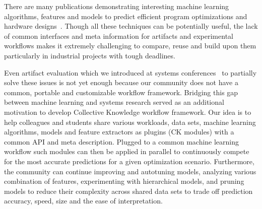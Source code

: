 There are many publications demonstrating interesting machine learning algorithms,
features and models to predict efficient program optimizations and hardware
designs~\cite{Monsifrot,SAMP2003,
Marin:2004:CPP:1012888.1005691, SA2005, soffa2005, ABCP06,
CFAP2007, DJBP2009, JGVP2009,
DBLP:conf/cf/ShenVSAS13,DBLP:journals/ijpp/ParkCPBCS13,
DBLP:journals/taco/LeatherBO14,
DBLP:conf/IEEEpact/CumminsP0L17,
Ashouri:2017:MMC:3132652.3124452}.
%
Though all these techniques can be potentially useful, the
lack of common interfaces and meta information for artifacts
and experimental workflows makes it extremely challenging 
to compare, reuse and build upon them particularly 
in industrial projects with tough deadlines.

Even artifact evaluation which we introduced at systems
conferences~\cite{ae} to partially solve these issues is not
yet enough because our community does not have a common, 
portable and customizable workflow framework.
%
Bridging this gap between machine learning and systems research
served as an additional motivation to develop Collective Knowledge
workflow framework.
%
Our idea is to help colleagues and students share various workloads, 
data sets, machine learning algorithms, models and feature extractors 
as plugins (CK modules) with a common API and meta description.
%
Plugged to a common machine learning workflow such modules
can then be applied in parallel to continuously compete 
for the most accurate predictions for a given optimization scenario.
%
Furthermore, the community can continue improving and autotuning models,
analyzing various combination of features, experimenting with hierarchical models, 
and pruning models to reduce their complexity across shared data sets 
to trade off prediction accuracy, speed, size and the ease of interpretation.

